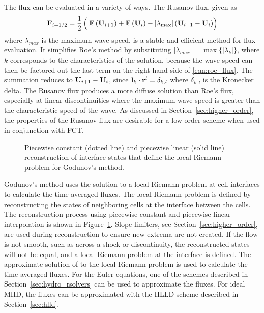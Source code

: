 The flux can be evaluated in a variety of ways.  The Rusanov flux, given as
\begin{gather}
\label{eqn:rusanov}
\mbf{F}_{i+1/2} = \half\left(\phantom{\frac{}{}}\mbf{F}\left(\mbf{U}_{i+1}\right) + \mbf{F}\left(\mbf{U}_{i}\right)
            - |\lambda_{\max}|\left(\mbf{U}_{i+1} - \mbf{U}_{i} \right) \right)
\end{gather}
where $\lambda_{max}$ is the maximum wave speed, is a stable and efficient method for flux evaluation.  It simplifies Roe's method by substituting $|\lambda_{max}| = \max\{|\lambda_k|\}$, where $k$ corresponds to the characteristics of the solution, because the wave speed can then be factored out the last term on the right hand side of \eqref{eqn:roe_flux}.  The summation reduces to $\mathbf{U}_{i+1} - \mathbf{U}_{i}$, since $\mathbf{l}_k\cdot\mathbf{r}^l = \delta_{k,l}$ where $\delta_{k,l}$ is the Kronecker delta.  The Rusanov flux produces a more diffuse solution than Roe's flux, especially at linear discontinuities where the maximum wave speed is greater than the characteristic speed of the wave.  As discussed in Section~\ref{sec:higher_order}, the properties of the Rusanov flux are desirable for a low-order scheme when used in conjunction with FCT.  

\begin{figure}[htbp]
\begin{center}

\end{center}
\caption{Piecewise constant (dotted line) and piecewise linear (solid line) reconstruction of interface states that define the local Riemann problem for Godunov's method.}
\label{fig:interface}
\end{figure}

Godunov's method uses the solution to a local Riemann problem at cell interfaces to calculate the time-averaged fluxes.  The local Riemann problem is defined by reconstructing the states of neighboring cells at the interface between the cells.  The reconstruction process using piecewise constant and piecewise linear interpolation is shown in Figure~\ref{fig:interface}.  Slope limiters, see Section~\ref{sec:higher_order}, are used during reconstruction to ensure new extrema are not created.  If the flow is not smooth, such as across a shock or discontinuity, the reconstructed states will not be equal, and a local Riemann problem at the interface is defined.  The approximate solution of to the local Riemann problem is used to calculate the time-averaged fluxes.  For the Euler equations, one of the schemes described in Section~\ref{sec:hydro_rsolvers} can be used to approximate the fluxes.  For ideal MHD, the fluxes can be approximated with the HLLD scheme described in Section~\ref{sec:hlld}.  

